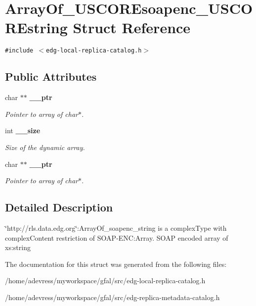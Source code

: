 \section{Array\-Of\_\-USCOREsoapenc\_\-USCOREstring Struct Reference}
\label{structArrayOf__USCOREsoapenc__USCOREstring}
{\tt \#include $<$edg-local-replica-catalog.h$>$}

\subsection*{Public Attributes}
\begin{CompactItemize}
\item 
char $\ast$$\ast$ \bf{\_\-\_\-ptr}\label{structArrayOf__USCOREsoapenc__USCOREstring_5306f8ec842dabbac21aedf30b056515}

\begin{CompactList}\small\item\em Pointer to array of char$\ast$. \item\end{CompactList}\item 
int \bf{\_\-\_\-size}\label{structArrayOf__USCOREsoapenc__USCOREstring_9007546278d85dc65f2b5cf9b0263b7d}

\begin{CompactList}\small\item\em Size of the dynamic array. \item\end{CompactList}\item 
char $\ast$$\ast$ \bf{\_\-\_\-ptr}\label{structArrayOf__USCOREsoapenc__USCOREstring_5306f8ec842dabbac21aedf30b056515}

\begin{CompactList}\small\item\em Pointer to array of char$\ast$. \item\end{CompactList}\end{CompactItemize}


\subsection{Detailed Description}
\char`\"{}http://rls.data.edg.org\char`\"{}:Array\-Of\_\-soapenc\_\-string is a complex\-Type with complex\-Content restriction of SOAP-ENC:Array. SOAP encoded array of xs:string 



The documentation for this struct was generated from the following files:\begin{CompactItemize}
\item 
/home/adevress/myworkspace/gfal/src/edg-local-replica-catalog.h\item 
/home/adevress/myworkspace/gfal/src/edg-replica-metadata-catalog.h\end{CompactItemize}
